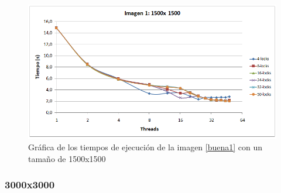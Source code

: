 \begin{figure}[H]
	\captionsetup{justification=centering}
	\centering
	\includegraphics[width=.9\textwidth]{./imagenes/graf1-1500}
	\caption{Gr\'{a}fica de los tiempos de ejecuci\'{o}n de la imagen \ref{buena1} con un tama\~{n}o de 1500x1500}	
	\label{graf1-1500}
\end{figure}

\subsubsection{3000x3000}

